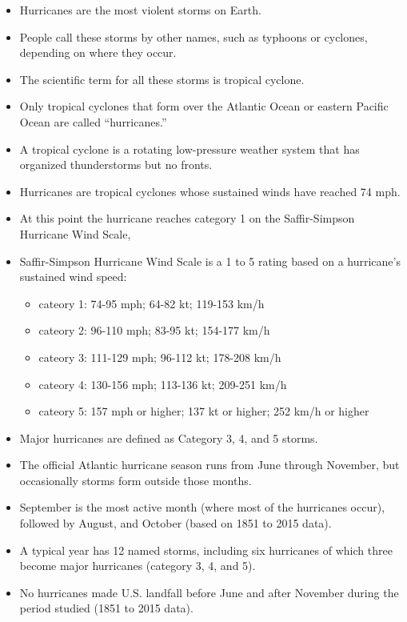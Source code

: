 \documentclass[
]{book}
\providecommand{\tightlist}{%
  \setlength{\itemsep}{0pt}\setlength{\parskip}{0pt}}
\begin{document}
\begin{itemize}
\item
  Hurricanes are the most violent storms on Earth.
\item
  People call these storms by other names, such as typhoons or cyclones,
  depending on where they occur.
\item
  The scientific term for all these storms is tropical cyclone.
\item
  Only tropical cyclones that form over the Atlantic Ocean or eastern Pacific
  Ocean are called ``hurricanes.''
\item
  A tropical cyclone is a rotating low-pressure weather system that has
  organized thunderstorms but no fronts.
\item
  Hurricanes are tropical cyclones whose sustained winds have reached 74 mph.
\item
  At this point the hurricane reaches category 1 on the Saffir-Simpson
  Hurricane Wind Scale,
\item
  Saffir-Simpson Hurricane Wind Scale is a 1 to 5 rating based on a hurricane's
  sustained wind speed:

  \begin{itemize}
  \tightlist
  \item
    cateory 1: 74-95 mph; 64-82 kt; 119-153 km/h
  \item
    cateory 2: 96-110 mph; 83-95 kt; 154-177 km/h
  \item
    cateory 3: 111-129 mph; 96-112 kt; 178-208 km/h
  \item
    cateory 4: 130-156 mph; 113-136 kt; 209-251 km/h
  \item
    cateory 5: 157 mph or higher; 137 kt or higher; 252 km/h or higher
  \end{itemize}
\item
  Major hurricanes are defined as Category 3, 4, and 5 storms.
\item
  The official Atlantic hurricane season runs from June through November, but
  occasionally storms form outside those months.
\item
  September is the most active month (where most of the hurricanes occur),
  followed by August, and October (based on 1851 to 2015 data).
\item
  A typical year has 12 named storms, including six hurricanes of which three
  become major hurricanes (category 3, 4, and 5).
\item
  No hurricanes made U.S. landfall before June and after November during the period studied (1851 to 2015 data).
\end{itemize}
\end{document}

